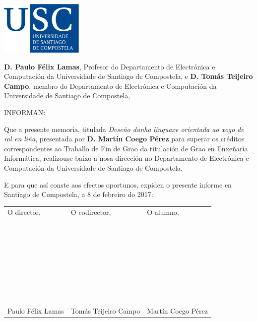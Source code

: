 \pagestyle{plain}
\includegraphics[width=4cm]{figuras/logo_usc.eps}

\vspace{1cm}
{\bf D. Paulo Félix Lamas}, Profesor do Departamento de Electrónica e
Computación da Universidade de Santiago de Compostela, e {\bf D. Tomás Teijeiro
Campo}, membro do Departamento de Electrónica e Computación da Universidade de
Santiago de Compostela,

\vspace{1cm}
INFORMAN:

\vspace{1cm}
Que a presente memoria, titulada {\it Deseño dunha linguaxe orientada ao xogo de
rol en liña}, presentada por {\bf D.
Martín Coego Pérez} para superar os créditos correspondentes ao
Traballo de Fin de Grao da titulación de Grao en Enxeñaría Informática,
realizouse baixo a nosa dirección no Departamento de Electrónica e Computación
da Universidade de Santiago de Compostela.

\vspace{1cm}
E para que así conste aos efectos oportunos, expiden o presente informe en
Santiago de Compostela, a 8 de febreiro do 2017:

\vspace{2cm}
\begin{tabular}{lll}
O director, & O codirector, & O alumno, \\
~ \\
~ \\
~ \\
~ \\
~ \\
~ \\
~ \\
Paulo Félix Lamas & Tomás Teijeiro Campo & Martín Coego Pérez
\end{tabular}

